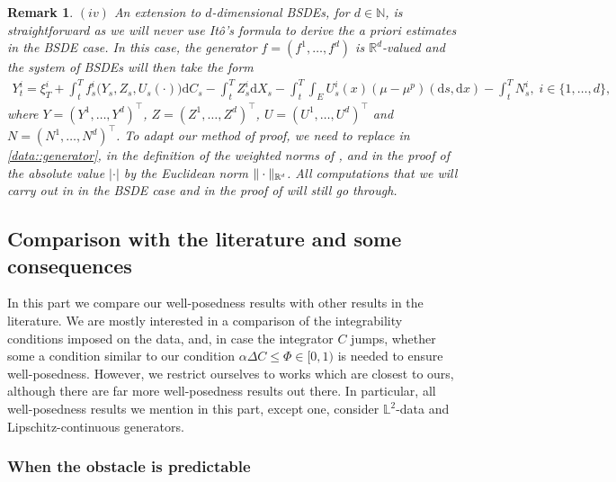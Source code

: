 \documentclass[10pt]{article} %
\newtheorem{remark}[theorem]{Remark}
\newcommand{\smalltext}[1]{\text{\fontsize{4}{4}\selectfont$#1$}}
\def \L{\mathbb{L}}
\def \N{\mathbb{N}}
\def \R{\mathbb{R}}
\def\d{\mathrm{d}}
\begin{document}
\begin{remark}
	\medskip
	$(iv)$ An extension to $d$-dimensional {\rm BSDEs}, for $d \in \N$, is straightforward as we will never use It\^o's formula to derive the \emph{a priori} estimates in the {\rm BSDE} case. In this case, the generator $f = (f^1,\ldots,f^d)$ is $\R^d$-valued and the system of {\rm BSDEs} will then take the form
		\begin{align*}
			Y^i_t = \xi^i_T + \int_t^T f^i_s\big(Y_s,Z_s, U_s(\cdot)\big) \d C_s - \int_t^T Z^i_s \d X_s - \int_t^T\int_E U^i_s(x)(\mu-\mu^p)(\d s,\d x) - \int_t^T N^i_s,\; i\in\{1,\dots,d\}, 
		\end{align*}
		where $Y = (Y^1,\ldots,Y^d)^\top$, $Z = (Z^1,\ldots,Z^d)^\top$, $U = (U^1,\ldots,U^d)^\top$ and $N = (N^1,\ldots,N^d)^\top$. To adapt our method of proof, we need to replace in \ref{data::generator}, in the definition of the weighted norms of {\rm{}}, and in the proof of {\rm{}} the absolute value $|\cdot|$ by the Euclidean norm $\|\cdot\|_{\R^\smalltext{d}}$. All computations that we will carry out in {\rm{}} in the {\rm BSDE} case and in the proof of {\rm{}} will still go through.
\end{remark}



\subsection{Comparison with the literature and some consequences}\label{sec::comparison_literature}


In this part we compare our well-posedness results with other results in the literature. We are mostly interested in a comparison of the integrability conditions imposed on the data, and, in case the integrator $C$ jumps, whether some a condition similar to our condition $\alpha\Delta C \leq \Phi \in [0,1)$ is needed to ensure well-posedness. However, we restrict ourselves to works which are closest to ours, although there are far more well-posedness results out there. In particular, all well-posedness results we mention in this part, except one, consider $\L^2$-data and Lipschitz-continuous generators.


\subsubsection{When the obstacle is predictable}
\end{document}
